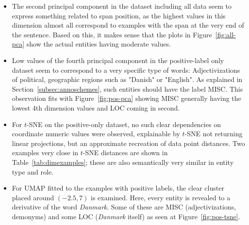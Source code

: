 \documentclass[main.tex]{subfiles}
\begin{document}
\begin{itemize}
    \item
        The second principal component in the dataset including all data seem to express something related to span position, as the highest values in this dimension almost all correspond to examples with the span at the very end of the sentence.
        Based on this, it makes sense that the plots in Figure~\ref{fig:all-pca} show the actual entities having moderate values.
    \item
        Low values of the fourth principal component in the positive-label only dataset seem to correspond to a very specific type of words:
        Adjectivizations of political, geographic regions such as "Danish" or "English".
        As explained in Section~\ref{subsec:annoschemes}, such entities should have the label MISC.
        This observation fits with Figure~\ref{fig:pos-pca} showing MISC generally having the lowest 4th dimension values and LOC coming in second.
    \item
        For $t$-SNE on the positive-only dataset, no such clear dependencies on coordinate numeric values were observed, explainable by $t$-SNE not returning linear projections, but an approximate recreation of data point distances.
        Two examples very close in $t$-SNE distances are shown in Table~\ref{tab:dimexamples}; these are also semantically very similar in entity type and role.
    \item
        For UMAP fitted to the examples with positive labels, the clear cluster placed around $\left( -2.5, 7\right)$ is examined.
        Here, every entity is revealed to a derivative of the word \emph{Danmark}.
        Some of these are MISC (adjectivizations, demonyms) and some LOC (\emph{Danmark} itself) as seen at Figure~\ref{fig:pos-tsne}.
\end{itemize}
\end{document}
